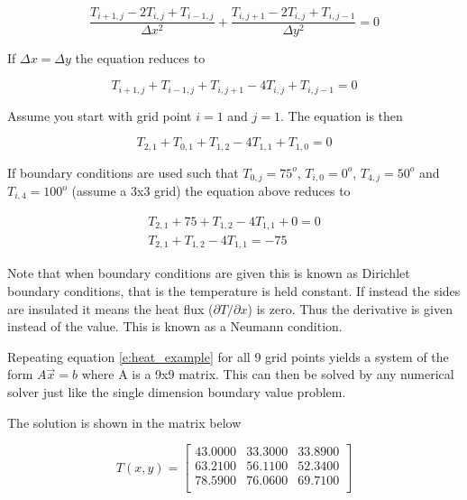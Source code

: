 \begin{enumerate}
    \begin{equation}
      \frac{T_{i+1,j} - 2T_{i,j} + T_{i-1,j}}{\Delta x^2} +
      \frac{T_{i,j+1} - 2T_{i,j} + T_{i,j-1}}{\Delta y^2} = 0
    \end{equation}

    If $\Delta x = \Delta y$ the equation reduces to 
    
    \begin{equation}\label{e:heat_equation2d}
      T_{i+1,j} + T_{i-1,j} + T_{i,j+1} - 4T_{i,j} + T_{i,j-1} = 0
    \end{equation}

    Assume you start with grid point $i=1$ and $j=1$. The equation is
    then

    \begin{equation}
      T_{2,1} + T_{0,1} + T_{1,2} - 4T_{1,1} + T_{1,0} = 0
    \end{equation}
    
    If boundary conditions are used such that $T_{0,j} = 75^o$,
    $T_{i,0} = 0^o$, $T_{4,j} = 50^o$ and $T_{i,4} = 100^o$ (assume a
    3x3 grid) the equation above reduces to

    \begin{equation}\label{e:heat_example}
      \begin{matrix}
      T_{2,1} + 75 + T_{1,2} - 4T_{1,1} + 0 = 0 \\
      T_{2,1} + T_{1,2} - 4T_{1,1}  = -75
      \end{matrix}
    \end{equation}

    Note that when boundary conditions are given this is known as
    Dirichlet boundary conditions, that is the temperature is held
    constant. If instead the sides are insulated it means the heat
    flux ($\partial T/\partial x$) is zero. Thus the derivative is
    given instead of the value. This is known as a Neumann condition. 

    Repeating equation \ref{e:heat_example} for all 9 grid points yields a system of
    the form $A\vec{x} = b$ where A is a 9x9 matrix. This can then be
    solved by any numerical solver just like the single dimension
    boundary value problem. 

    The solution is shown in the matrix below

    \begin{equation}
      T(x,y) = \begin{bmatrix} 43.0000   & 33.3000 &  33.8900 \\
        63.2100 &  56.1100 &  52.3400 \\
        78.5900 &  76.0600 &  69.7100 \\
      \end{bmatrix}
    \end{equation}
    

\end{enumerate}
